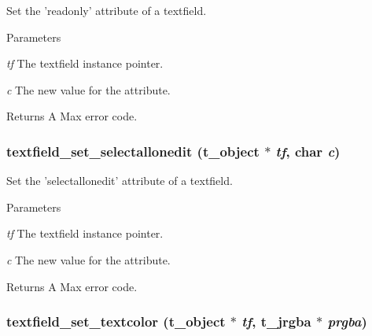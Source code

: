 Set the 'readonly' attribute of a textfield. 
\begin{DoxyParams}{Parameters}
\item[{\em tf}]The textfield instance pointer. \item[{\em c}]The new value for the attribute. \end{DoxyParams}
\begin{DoxyReturn}{Returns}
A Max error code. 
\end{DoxyReturn}
\hypertarget{group__textfield_ga334c020b1542124e3397f53cff31d8e1}{
\subsubsection[{textfield\_\-set\_\-selectallonedit}]{ textfield\_\-set\_\-selectallonedit ({\bf t\_\-object} $\ast$ {\em tf}, \/  char {\em c})}}
\label{group__textfield_ga334c020b1542124e3397f53cff31d8e1}


Set the 'selectallonedit' attribute of a textfield. 
\begin{DoxyParams}{Parameters}
\item[{\em tf}]The textfield instance pointer. \item[{\em c}]The new value for the attribute. \end{DoxyParams}
\begin{DoxyReturn}{Returns}
A Max error code. 
\end{DoxyReturn}
\hypertarget{group__textfield_gaedcc4a931fedcdcc533235c28d540d32}{
\subsubsection[{textfield\_\-set\_\-textcolor}]{ textfield\_\-set\_\-textcolor ({\bf t\_\-object} $\ast$ {\em tf}, \/  {\bf t\_\-jrgba} $\ast$ {\em prgba})}}
\label{group__textfield_gaedcc4a931fedcdcc533235c28d540d32}


